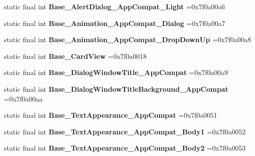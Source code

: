 \begin{DoxyCompactItemize}
static final int {\bfseries Base\+\_\+\+Alert\+Dialog\+\_\+\+App\+Compat\+\_\+\+Light} =0x7f0a00a6
\item 
\mbox{\label{classproject4_1_1xaria_1_1R_1_1style_a474355782d389bbdf5633bf5bf903d2a}} 
static final int {\bfseries Base\+\_\+\+Animation\+\_\+\+App\+Compat\+\_\+\+Dialog} =0x7f0a00a7
\item 
\mbox{\label{classproject4_1_1xaria_1_1R_1_1style_a9ec37313590bfb2ff6742cbea6eab1b3}} 
static final int {\bfseries Base\+\_\+\+Animation\+\_\+\+App\+Compat\+\_\+\+Drop\+Down\+Up} =0x7f0a00a8
\item 
\mbox{\label{classproject4_1_1xaria_1_1R_1_1style_a528904b6343c5e6d8440f027f836b8e1}} 
static final int {\bfseries Base\+\_\+\+Card\+View} =0x7f0a0018
\item 
\mbox{\label{classproject4_1_1xaria_1_1R_1_1style_a956176e763586cfdf7ed365d4226ce60}} 
static final int {\bfseries Base\+\_\+\+Dialog\+Window\+Title\+\_\+\+App\+Compat} =0x7f0a00a9
\item 
\mbox{\label{classproject4_1_1xaria_1_1R_1_1style_af343a51c102c21bb5ea4a0fd985d42f9}} 
static final int {\bfseries Base\+\_\+\+Dialog\+Window\+Title\+Background\+\_\+\+App\+Compat} =0x7f0a00aa
\item 
\mbox{\label{classproject4_1_1xaria_1_1R_1_1style_ab15adc6b2a911cb39c37b3e5ff1040c1}} 
static final int {\bfseries Base\+\_\+\+Text\+Appearance\+\_\+\+App\+Compat} =0x7f0a0051
\item 
\mbox{\label{classproject4_1_1xaria_1_1R_1_1style_ac25ef65d619563a15eeb0e70d370259d}} 
static final int {\bfseries Base\+\_\+\+Text\+Appearance\+\_\+\+App\+Compat\+\_\+\+Body1} =0x7f0a0052
\item 
\mbox{\label{classproject4_1_1xaria_1_1R_1_1style_a48560755e0fff3c33532964c49cf277a}} 
static final int {\bfseries Base\+\_\+\+Text\+Appearance\+\_\+\+App\+Compat\+\_\+\+Body2} =0x7f0a0053

\end{DoxyCompactItemize}
